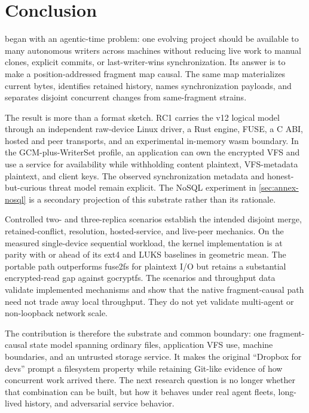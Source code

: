 \section{Conclusion}
\label{sec:conclusion}

\sfs{} began with an agentic-time problem: one evolving project should be
available to many autonomous writers across machines without reducing live work
to manual clones, explicit commits, or last-writer-wins synchronization.  Its
answer is to make a position-addressed fragment map causal.  The same map
materializes current bytes, identifies retained history, names synchronization
payloads, and separates disjoint concurrent changes from same-fragment strains.

The result is more than a format sketch.  RC1 carries the v12 logical model
through an independent raw-device Linux driver, a Rust engine, FUSE, a C ABI,
hosted and peer transports, and an experimental in-memory wasm boundary.  In
the GCM-plus-WriterSet profile, an application can own the encrypted VFS and
use a service for availability while withholding content plaintext,
VFS-metadata plaintext, and client keys.  The observed synchronization metadata
and honest-but-curious threat model remain explicit.  The NoSQL experiment in
\cref{sec:annex-nosql} is a secondary projection of this substrate rather than
its rationale.

Controlled two- and three-replica scenarios establish the intended disjoint
merge, retained-conflict, resolution, hosted-service, and live-peer mechanics.
On the measured single-device sequential workload, the kernel implementation
is at parity with or ahead of its ext4 and LUKS baselines in geometric mean.
The portable path outperforms fuse2fs for plaintext I/O but retains a
substantial encrypted-read gap against gocryptfs.  The scenarios and throughput
data validate implemented mechanisms and show that the native fragment-causal
path need not trade away local throughput.  They do not yet validate multi-agent
or non-loopback network scale.

The contribution is therefore the substrate and common boundary: one
fragment-causal state model spanning ordinary files, application VFS use,
machine boundaries, and an untrusted storage service.  It makes the original
``Dropbox for devs'' prompt a
filesystem property while retaining Git-like evidence of how concurrent work
arrived there.  The next research question is no longer whether that
combination can be built, but how it behaves under real agent fleets, long-lived
history, and adversarial service behavior.
